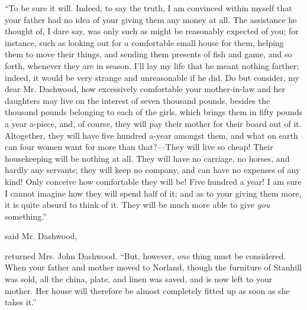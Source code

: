 “To be sure it will. Indeed, to say the truth, I am convinced within myself that your father had no idea of your giving them any money at all. The assistance he thought of, I dare say, was only such as might be reasonably expected of you; for instance, such as looking out for a comfortable small house for them, helping them to move their things, and sending them presents of fish and game, and so forth, whenever they are in season. I'll lay my life that he meant nothing farther; indeed, it would be very strange and unreasonable if he did. Do but consider, my dear Mr. Dashwood, how excessively comfortable your mother-in-law and her daughters may live on the interest of seven thousand pounds, besides the thousand pounds belonging to each of the girls, which brings them in fifty pounds a year a-piece, and, of course, they will pay their mother for their board out of it. Altogether, they will have five hundred a-year amongst them, and what on earth can four women want for more than that?---They will live so cheap! Their housekeeping will be nothing at all. They will have no carriage, no horses, and hardly any servants; they will keep no company, and can have no expenses of any kind! Only conceive how comfortable they will be! Five hundred a year! I am sure I cannot imagine how they will spend half of it; and as to your giving them more, it is quite absurd to think of it. They will be much more able to give {\em you} something.”

 said Mr. Dashwood, 

 returned Mrs. John Dashwood. “But, however, {\em one} thing must be considered. When your father and mother moved to Norland, though the furniture of Stanhill was sold, all the china, plate, and linen was saved, and is now left to your mother. Her house will therefore be almost completely fitted up as soon as she takes it.”


